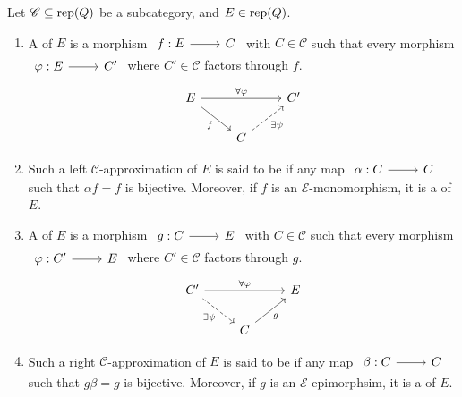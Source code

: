 \begin{definition}[\cite{AS94}] \label{def:leftrightminapprox}
Let $\mathscr{C} \subseteq \operatorname{rep}(Q)$ be a subcategory, and $E \in \operatorname{rep}(Q)$. 
\begin{enumerate}[label=$\bullet$, itemsep=1mm]
    \item A  of $E$ is a morphism $\begin{tikzcd}
	f: E & C
	\arrow[from=1-1, to=1-2]
	\end{tikzcd}$ with $C \in \mathscr{C}$ such that every morphism $\begin{tikzcd}
	\varphi: E & C'
	\arrow[from=1-1, to=1-2]
	\end{tikzcd}$ where $C' \in \mathscr{C}$ factors through $f$.
    \[\begin{tikzcd}
	 E & & C' \\
     & C & 
	\arrow["\forall\varphi",from=1-1, to=1-3]
        \arrow["f"', from=1-1, to=2-2]
        \arrow["\exists \psi"', dashed, from=2-2,to=1-3]
	\end{tikzcd}\]
    \item Such a left $\mathscr{C}$-approximation of $E$ is said to be  if any map $\begin{tikzcd}
	\alpha: C & C
	\arrow[from=1-1, to=1-2]
	\end{tikzcd}$ such that $\alpha f = f$ is bijective.
    Moreover, if $f$ is an $\mathcal{E}$-monomorphism, it is a  of $E$.
    \item A  of $E$ is a morphism $\begin{tikzcd}
	g: C & E
	\arrow[from=1-1, to=1-2]
	\end{tikzcd}$ with $C \in \mathscr{C}$ such that every morphism $\begin{tikzcd}
	\varphi: C' & E
	\arrow[from=1-1, to=1-2]
	\end{tikzcd}$ where $C' \in \mathscr{C}$ factors through $g$.
    \[\begin{tikzcd}
	 C' & & E \\
     & C & 
	\arrow["\forall\varphi",from=1-1, to=1-3]
        \arrow["\exists \psi"',dashed, from=1-1, to=2-2]
        \arrow["g"', from=2-2,to=1-3]
	\end{tikzcd}\]
    \item Such a right $\mathscr{C}$-approximation of $E$ is said to be  if any map $\begin{tikzcd}
	\beta: C & C
	\arrow[from=1-1, to=1-2]
	\end{tikzcd}$ such that $g \beta = g$ is bijective.
    Moreover, if $g$ is an $\mathcal{E}$-epimorphsim, it is a   of $E$. 
\end{enumerate}
\end{definition}

